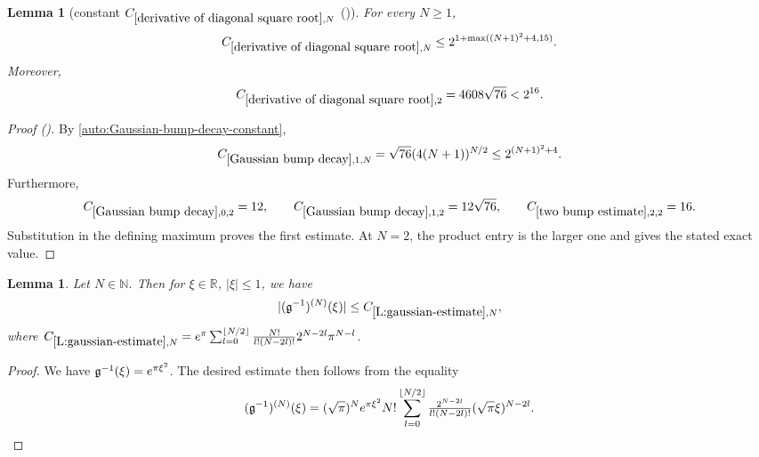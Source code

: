 \documentclass[12pt,reqno]{amsart}
\newcommand{\auto}{{({\tiny\faCar})}}
\theoremstyle{plain}
\newtheorem{lemma}[theorem]{Lemma}
\numberwithin{equation}{section}
\theoremstyle{remark}
\newcommand{\using}[1]{}
\newcommand{\R}{{\mathbb R}}
\newcommand{\N}{{\mathbb N}}
\begin{document}
\begin{lemma}[constant $C_{\ref{derivative of diagonal square root},N}$ \auto]\label{constant derivative diagonal square root}\using{Gaussian bump decay}\using{two bump estimate}\using{derivative of diagonal square root}
For every $N\ge1$,
\begin{equation}\label{constant derivative diagonal square root bound}
C_{\ref{derivative of diagonal square root},N}
\le2^{1+\max((N+1)^2+4,15)}.
\end{equation}
Moreover,
\begin{equation}\label{auto:constant-derivative-diagonal-square-root-two}
C_{\ref{derivative of diagonal square root},2}=4608\sqrt{76}<2^{16}.
\end{equation}
\end{lemma}
\begin{proof}[Proof \auto]
By \eqref{auto:Gaussian-bump-decay-constant},
\[
C_{\ref{Gaussian bump decay},1,N}
=\sqrt{76}(4(N+1))^{N/2}
\le2^{(N+1)^2+4}.
\]
Furthermore,
\[
C_{\ref{Gaussian bump decay},0,2}=12,
\qquad
C_{\ref{Gaussian bump decay},1,2}=12\sqrt{76},
\qquad
C_{\ref{two bump estimate},2,2}=16.
\]
Substitution in the defining maximum proves the first estimate. At $N=2$, the product entry is the larger one and gives the stated exact value.
\end{proof}


\begin{lemma}\label{L:gaussian-estimate}
Let $N\in \N$. Then for $\xi \in \R$, $|\xi|\leq 1$, we have
\begin{equation}\label{auto:inverse-Gaussian-derivative-bound}
|(\mathfrak{g}^{-1})^{(N)}(\xi)| \leq C_{\ref{L:gaussian-estimate},N},
\end{equation}
where $C_{\ref{L:gaussian-estimate},N}=e^{\pi} \sum_{l=0}^{\lfloor N/2 \rfloor} \frac{N!}{l!(N-2l)!} 2^{N-2l} \pi^{N-l}$.
\end{lemma}

\begin{proof}
We have $\mathfrak{g}^{-1}(\xi)=e^{\pi\xi^2}$. The desired estimate then follows from the equality
\[
(\mathfrak{g}^{-1})^{(N)}(\xi)
=(\sqrt{\pi})^{N} e^{\pi  \xi^2} N!\sum_{l=0}^{\lfloor N/2\rfloor} \tfrac{2^{N-2l}}{l!(N -2l)!} (\sqrt{\pi} \xi)^{N-2l}.
\]
\end{proof}
\end{document}

